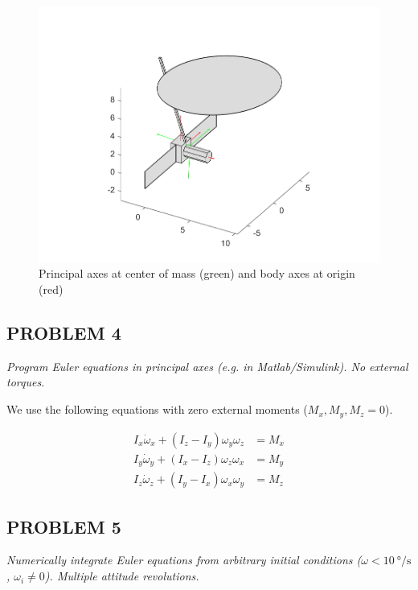 \begin{figure}[H]
\centering
\includegraphics[scale=0.7]{Images/ps2_model.png}
\caption{Principal axes at center of mass (green) and body axes at origin (red)}
\label{fig:ps2_model}
\end{figure}


\subsection{PROBLEM 4}
\textit{Program Euler equations in principal axes (e.g. in Matlab/Simulink). No external torques.}

We use the following equations with zero external moments ($M_{x}, M_{y}, M_{z} = 0$).

\begin{align*}
    I_{x} \Dot{\omega}_{x} + (I_{z} - I_{y}) \omega_{y} \omega_{z} &= M_{x} \\
    I_{y} \Dot{\omega}_{y} + (I_{x} - I_{z}) \omega_{z} \omega_{x} &= M_{y} \\
    I_{z} \Dot{\omega}_{z} + (I_{y} - I_{x}) \omega_{x} \omega_{y} &= M_{z}
\end{align*}




\subsection{PROBLEM 5}
\textit{Numerically integrate Euler equations from arbitrary initial conditions ($\omega<\qty{10}{\degree/\second}$, $\omega_{i}\neq0$). Multiple attitude revolutions.}

